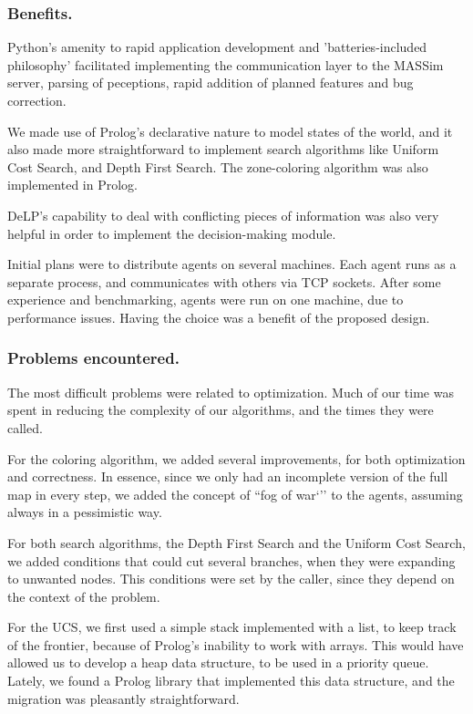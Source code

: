 \documentclass{llncs2e/llncs}
\begin{document}
\subsubsection{Benefits.}
    
    Python's amenity to rapid application development and 'batteries-included 
    philosophy' facilitated implementing the communication layer to the MASSim 
    server, parsing of peceptions, rapid addition of planned features and bug 
    correction.

    We made use of Prolog's declarative nature to model states of the world, and it 
    also made more straightforward to implement search algorithms like Uniform Cost 
    Search, and Depth First Search. The zone-coloring algorithm was also 
    implemented in Prolog.
    
    DeLP's capability to deal with conflicting pieces of information was also very
    helpful in order to implement the decision-making module.
    
    Initial plans were to distribute agents on several machines. Each agent runs 
    as a separate process, and communicates with others via TCP sockets. After 
    some experience and benchmarking, agents were run on one machine, due to 
    performance issues. 
    Having the choice was a benefit of the proposed design.

\subsubsection{Problems encountered.}

    The most difficult problems were related to optimization. Much of our time was 
    spent in reducing the complexity of our algorithms, and the times they 
    were called.

    For the coloring algorithm, we added several improvements, for both 
    optimization and correctness. In essence, since we only had an incomplete 
    version of the full map in every step, we added the concept of ``fog of war`'' 
    to the agents, assuming always in a pessimistic way. 

    For both search algorithms, the Depth First Search and the Uniform Cost 
    Search, we added conditions that could cut several branches, when they were 
    expanding to unwanted nodes. This conditions were set by the caller, since 
    they depend on the context of the problem.

    For the UCS, we first used a simple stack implemented with a list, to keep 
    track of the frontier, because of Prolog's inability to work with arrays. This 
    would have allowed us to develop a heap data structure, to be used in a 
    priority queue. Lately, we found a Prolog library that implemented this data 
    structure, and the migration was pleasantly straightforward.
\end{document}
